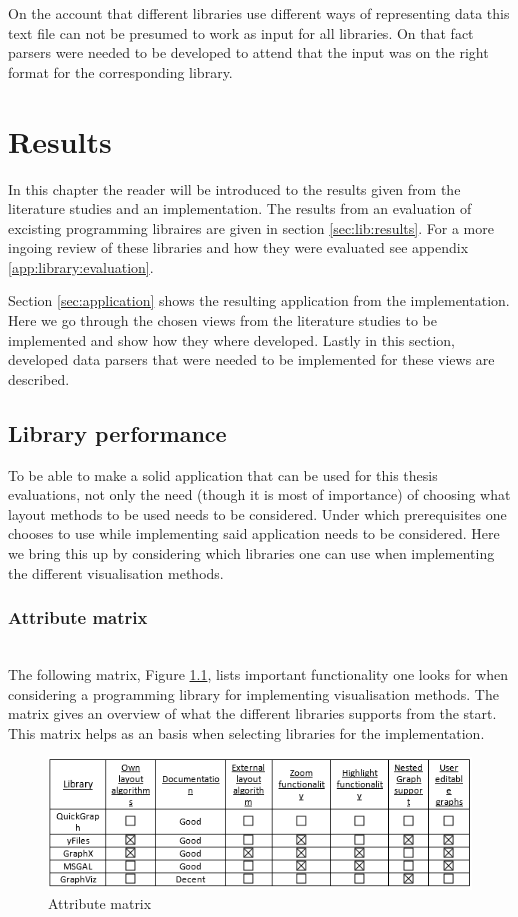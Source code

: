 \documentclass[a4paper,11pt]{kth-mag}
\begin{document}
On the account that different libraries use different ways of representing data this text file can not be presumed to work as input for all libraries. On that fact parsers were needed to be developed to
attend that the input was on the right format for the corresponding library.
\chapter{Results}
\label{chap:results}
In this chapter the reader will be introduced to the results given from the literature studies and an implementation. The results from an evaluation of excisting programming
 libraires are given in section \ref{sec:lib:results}. For a more ingoing review of these libraries and how they were evaluated see appendix \ref{app:library:evaluation}.

Section \ref{sec:application} shows the resulting application from the implementation. Here we go through the chosen views from the literature studies to be implemented and show how they where developed. Lastly in this section,
developed data parsers that were needed to be implemented for these views are described.
\section{Library performance}
\label{sec:libperform}
To be able to make a solid application that can be used for this thesis evaluations, not only the need (though it is most of importance) of choosing what layout methods to be used needs to be considered. Under which prerequisites
one chooses to use while implementing said application needs to be considered. Here we bring this up by considering which libraries one can use when implementing the different visualisation methods.
\subsection{Attribute matrix}
\label{Lib:attribute}
\newline
\\
The following matrix, Figure \ref{fig:AttributeMatrix}, lists important functionality one looks for when considering a programming library for implementing visualisation methods. The matrix gives an overview of what the 
different libraries supports from the start. This matrix helps as an basis when selecting libraries for the implementation.\\

\begin{figure}[!htbp]
	\centering
	\includegraphics[scale=1.0]{LibraryAttributeMatrix}
	\caption{Attribute matrix}
	\label{fig:AttributeMatrix}
\end{figure}
\end{document}

